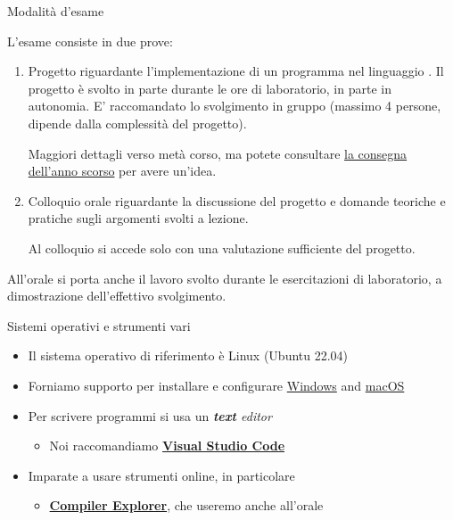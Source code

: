 \begin{frame}{Modalità d'esame}

  L'esame consiste in due prove:

  \begin{enumerate}

  \item Progetto riguardante l'implementazione di un programma nel linguaggio
    \Cpp{}. Il progetto è svolto in parte durante le ore di laboratorio, in
    parte in autonomia. E' raccomandato lo svolgimento in gruppo (massimo 4
    persone, dipende dalla complessità del progetto).

    Maggiori dettagli verso metà corso, ma potete consultare
    \href{https://github.com/Programmazione-per-la-Fisica/progetto2022}{la
      consegna dell'anno scorso} per avere un'idea.

  \item Colloquio orale riguardante la discussione del progetto e domande
    teoriche e pratiche sugli argomenti svolti a lezione.

    Al colloquio si accede solo con una valutazione sufficiente del progetto.

  \end{enumerate}

  All'orale si porta anche il lavoro svolto durante le esercitazioni di
  laboratorio, a dimostrazione dell'effettivo svolgimento.

\end{frame}

\begin{frame}{Sistemi operativi e strumenti vari}
  \begin{itemize}[<+->]
  \item Il sistema operativo di riferimento è Linux (Ubuntu 22.04)
  \item Forniamo supporto per installare e configurare
      \href{https://github.com/Programmazione-per-la-Fisica/howto/blob/main/other-OSes/WSLGuide.md}{Windows} and
      \href{https://github.com/Programmazione-per-la-Fisica/howto/blob/main/other-OSes/macOSGuide.md}{macOS}
  \item Per scrivere programmi si usa un \textit{\textbf{text} editor}
    \begin{itemize}[<.->]
    \item Noi raccomandiamo \href{https://code.visualstudio.com/}{\textbf{Visual
          Studio Code}}
    \end{itemize}
  \item Imparate a usare strumenti online, in particolare
    \begin{itemize}[<.->]
    \item \href{https://godbolt.org/}{\textbf{Compiler Explorer}}, che useremo
      anche all'orale
    \end{itemize}
  \end{itemize}

\end{frame}

